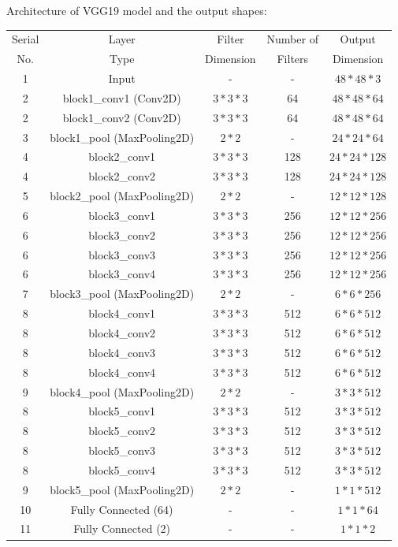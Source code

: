 \documentclass[12pt]{article}
\begin{document}
\begin{enumerate}
Architecture of VGG19 model and the output shapes:\\
	\begin{tabular}{|c|c|c|c|c|}
	\hline
	Serial & Layer & Filter & Number of & Output \\ 
	No. & Type & Dimension & Filters & Dimension \\ \hline
	1 & Input & - & - & $48*48*3$ \\ \hline
	2 & block1\_conv1 (Conv2D)& $3*3*3$ & 64 & $48*48*64$ \\
	2 & block1\_conv2 (Conv2D) & $3*3*3$ & 64 & $48*48*64$ \\
	3 & block1\_pool (MaxPooling2D)  & $2*2$ & - & $24*24*64$ \\ \hline 
	4 & block2\_conv1 & $3*3*3$ & 128 & $24*24*128$ \\
	4 & block2\_conv2 & $3*3*3$ & 128 & $24*24*128$ \\
	5 & block2\_pool (MaxPooling2D)& $2*2$ & - & $12*12*128$ \\ \hline 
	6 & block3\_conv1& $3*3*3$ & 256 & $12*12*256$ \\
	6 & block3\_conv2& $3*3*3$ & 256 & $12*12*256$ \\
	6 & block3\_conv3& $3*3*3$ & 256 & $12*12*256$ \\
	6 & block3\_conv4& $3*3*3$ & 256 & $12*12*256$ \\
	7 & block3\_pool (MaxPooling2D) & $2*2$ & - & $6*6*256$ \\ \hline 
	8 & block4\_conv1 & $3*3*3$ & 512 & $6*6*512$ \\
	8 & block4\_conv2 & $3*3*3$ & 512 & $6*6*512$ \\
	8 & block4\_conv3 & $3*3*3$ & 512 & $6*6*512$ \\
	8 & block4\_conv4 & $3*3*3$ & 512 & $6*6*512$ \\
	9 & block4\_pool (MaxPooling2D)& $2*2$ & - & $3*3*512$ \\ \hline 
	8 & block5\_conv1 & $3*3*3$ & 512 & $3*3*512$ \\
	8 & block5\_conv2 & $3*3*3$ & 512 & $3*3*512$ \\
	8 & block5\_conv3 & $3*3*3$ & 512 & $3*3*512$ \\
	8 & block5\_conv4 & $3*3*3$ & 512 & $3*3*512$ \\
	9 & block5\_pool (MaxPooling2D)& $2*2$ & - & $1*1*512$ \\ \hline 
	10 & Fully Connected (64)& - & - & $1*1*64$ \\ \hline
	11 & Fully Connected (2) & - & - & $1*1*2$ \\

\end{tabular}
\end{enumerate}
\end{document}
